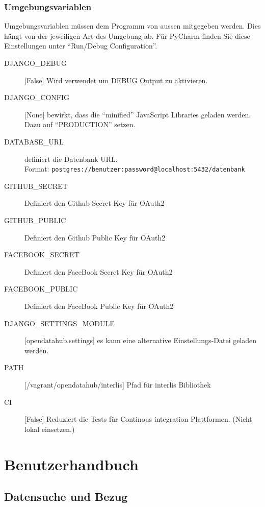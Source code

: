 \subsection{Umgebungsvariablen} \label{sec:sd:umgebungsvariablen}
Umgebungsvariablen müssen dem Programm von aussen mitgegeben werden. Dies hängt von der jeweiligen Art des Umgebung ab. Für PyCharm finden Sie diese Einstellungen unter ``Run/Debug Configuration''.


\begin{description}
\item[DJANGO\_DEBUG]{[}False{]} Wird verwendet um DEBUG Output zu aktivieren. 
\item[DJANGO\_CONFIG]{[}None{]} bewirkt, dass die ``minified'' JavaScript Libraries geladen werden. Dazu auf ``PRODUCTION'' setzen.
\item[DATABASE\_URL] definiert die Datenbank URL. \\Format: \texttt{postgres://benutzer:password@localhost:5432/datenbank}
\item[GITHUB\_SECRET] Definiert den Github Secret Key für OAuth2
\item[GITHUB\_PUBLIC] Definiert den Github Public Key für OAuth2
\item[FACEBOOK\_SECRET] Definiert den FaceBook Secret Key für OAuth2
\item[FACEBOOK\_PUBLIC] Definiert den FaceBook Public Key für OAuth2
\item[DJANGO\_SETTINGS\_MODULE]{[}opendatahub.settings{]} es kann eine alternative Einstellungs-Datei geladen werden.
\item[PATH]{[}/vagrant/opendatahub/interlis{]} Pfad für interlis Bibliothek
\item[CI]{[}False{]} Reduziert die Tests für Continous integration Plattformen. (Nicht lokal einsetzen.)
\end{description}
\chapter{Benutzerhandbuch}

\section{Datensuche und Bezug} \label{sec:sd:daten-suchen}


